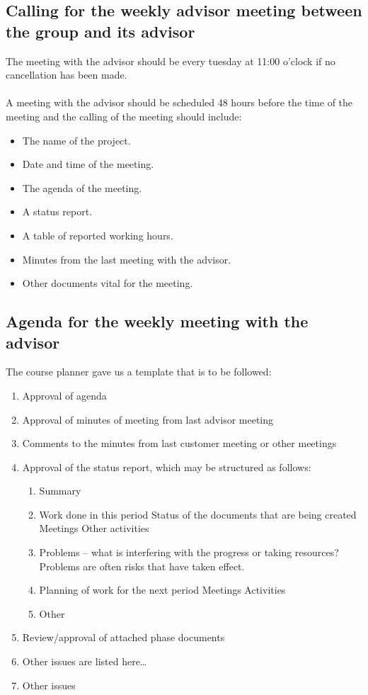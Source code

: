 \subsection{Calling for the weekly advisor meeting between the group and its advisor}
The meeting with the advisor should be every tuesday at 11:00 o’clock if no cancellation has been made.\\
\\
A meeting with the advisor should be scheduled 48 hours before the time of the meeting and the calling of the meeting should include:
\begin{itemize}
\item{}The name of the project.
\item{}Date and time of the meeting.
\item{}The agenda of the meeting.
\item{}A status report.
\item{}A table of reported working hours.
\item{}Minutes from the last meeting with the advisor.
\item{}Other documents vital for the meeting.
\end{itemize}

\newpage
\subsection{Agenda for the weekly meeting with the advisor}
The course planner gave us a template that is to be followed:
\begin{enumerate}
\item{}Approval of agenda
\item{}Approval of minutes of meeting from last advisor meeting
\item{}Comments to the minutes from last customer meeting or other meetings
\item{}Approval of the status report, which may be structured as follows:
\begin{enumerate}
\item{}Summary
\item{}Work done in this period
\subitem{}Status of the documents that are being created
\subitem{}Meetings
\subitem{}Other activities
\item{}Problems – what is interfering with the progress or taking resources? Problems are often risks that have taken effect.
\item{}Planning of work for the next period
\subitem{}Meetings
\subitem{}Activities
\item{}Other
\end{enumerate}
\item{}Review/approval of attached phase documents
\item{}Other issues are listed here…
\item{}Other issues
\end{enumerate}


